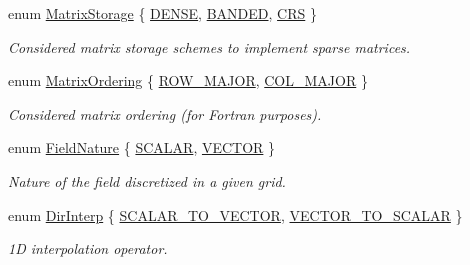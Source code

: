 \begin{DoxyCompactItemize}
\item 
enum \hyperlink{group__c02-enums_ga25b67ec6a2afeee69f9bb196a9c66619}{Matrix\-Storage} \{ \hyperlink{group__c02-enums_ga25b67ec6a2afeee69f9bb196a9c66619a00a806d43a7d74e9ccca47a2134e9c87}{D\-E\-N\-S\-E}, 
\hyperlink{group__c02-enums_ga25b67ec6a2afeee69f9bb196a9c66619aef1d4271d5005282978a3a40a8a52c9b}{B\-A\-N\-D\-E\-D}, 
\hyperlink{group__c02-enums_ga25b67ec6a2afeee69f9bb196a9c66619a87619d374775e937bca967402b988b8b}{C\-R\-S}
 \}
\begin{DoxyCompactList}\small\item\em Considered matrix storage schemes to implement sparse matrices. \end{DoxyCompactList}\item 
enum \hyperlink{group__c02-enums_ga622801bd9f912d0f976c3e383f5f581c}{Matrix\-Ordering} \{ \hyperlink{group__c02-enums_ga622801bd9f912d0f976c3e383f5f581cabc55178ac16eb1ce89b5f3ab915a91f3}{R\-O\-W\-\_\-\-M\-A\-J\-O\-R}, 
\hyperlink{group__c02-enums_ga622801bd9f912d0f976c3e383f5f581ca7c11989c132253fb76b8f6b1314f7e13}{C\-O\-L\-\_\-\-M\-A\-J\-O\-R}
 \}
\begin{DoxyCompactList}\small\item\em Considered matrix ordering (for Fortran purposes). \end{DoxyCompactList}\item 
enum \hyperlink{group__c02-enums_ga4c54f2a329cfb4e56213b02a259d19e2}{Field\-Nature} \{ \hyperlink{group__c02-enums_ga4c54f2a329cfb4e56213b02a259d19e2af481d45bd70d41381c7d72e200889205}{S\-C\-A\-L\-A\-R}, 
\hyperlink{group__c02-enums_ga4c54f2a329cfb4e56213b02a259d19e2a3d8cb27a993651a74d67fb8c98ae91b2}{V\-E\-C\-T\-O\-R}
 \}
\begin{DoxyCompactList}\small\item\em Nature of the field discretized in a given grid. \end{DoxyCompactList}\item 
enum \hyperlink{group__c02-enums_ga674ec67bd1baa04e5dc06c2bcc351972}{Dir\-Interp} \{ \hyperlink{group__c02-enums_ga674ec67bd1baa04e5dc06c2bcc351972abc9e2b8cd5a497c9f3252a792e356139}{S\-C\-A\-L\-A\-R\-\_\-\-T\-O\-\_\-\-V\-E\-C\-T\-O\-R}, 
\hyperlink{group__c02-enums_ga674ec67bd1baa04e5dc06c2bcc351972a122cf2e24aef105e9214698206af6904}{V\-E\-C\-T\-O\-R\-\_\-\-T\-O\-\_\-\-S\-C\-A\-L\-A\-R}
 \}
\begin{DoxyCompactList}\small\item\em 1\-D interpolation operator. \end{DoxyCompactList}\end{DoxyCompactItemize}
